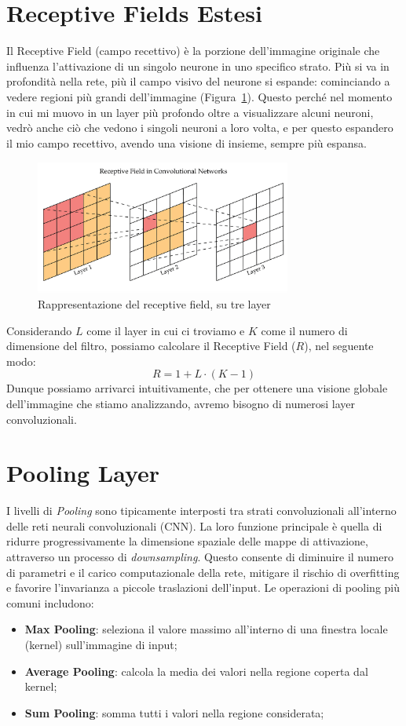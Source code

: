 \section{Receptive Fields Estesi}

Il Receptive Field (campo recettivo) è la porzione dell’immagine originale che influenza l’attivazione di un singolo neurone in uno specifico strato. Più si va in profondità nella rete, più il campo visivo del neurone si espande: cominciando a vedere regioni più grandi dell'immagine (Figura~\ref{fig:recp_field}). Questo perché nel momento in cui mi muovo in un layer più profondo oltre a visualizzare alcuni neuroni, vedrò anche ciò che vedono i singoli neuroni a loro volta, e per questo espandero il mio campo recettivo, avendo una visione di insieme, sempre più espansa.
\begin{figure}
    \centering
    \includegraphics[width=0.75\textwidth]{figure/receptive_field.png}
    \caption{Rappresentazione del receptive field, su tre layer}
    \label{fig:recp_field}
\end{figure}
Considerando $L$ come il layer in cui ci troviamo e $K$ come il numero di dimensione del filtro, possiamo calcolare il Receptive Field ($R$), nel seguente modo:
\[
R = 1 + L \cdot (K - 1)
\]
Dunque possiamo arrivarci intuitivamente, che per ottenere una visione globale dell'immagine che stiamo analizzando, avremo bisogno di numerosi layer convoluzionali.
\section{Pooling Layer}

I livelli di \textit{Pooling} sono tipicamente interposti tra strati convoluzionali all'interno delle reti neurali convoluzionali (CNN). La loro funzione principale è quella di ridurre progressivamente la dimensione spaziale delle mappe di attivazione, attraverso un processo di \textit{downsampling}. Questo consente di diminuire il numero di parametri e il carico computazionale della rete, mitigare il rischio di overfitting e favorire l’invarianza a piccole traslazioni dell’input. Le operazioni di pooling più comuni includono:
\begin{itemize}
    \item \textbf{Max Pooling}: seleziona il valore massimo all'interno di una finestra locale (kernel) sull'immagine di input;
    \item \textbf{Average Pooling}: calcola la media dei valori nella regione coperta dal kernel;
    \item \textbf{Sum Pooling}: somma tutti i valori nella regione considerata;
\end{itemize}

